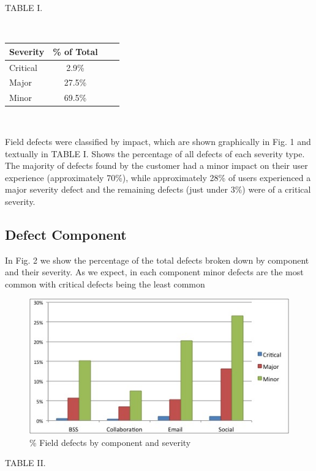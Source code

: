 \documentclass[conference]{IEEEtran}
\begin{document}
TABLE I. 

\ \

\begin{tabular}{l*{2}{c}r} Severity & \% of Total \\ \hline Critical & 2.9\% \\ Major & 27.5\% \\ Minor & 69.5\%   \end{tabular}

\ \

Field defects were classified by impact, which are shown graphically in Fig. 1 and textually in TABLE I.  Shows the percentage of all defects of each severity type. The majority of defects found by the customer had a minor impact on their user experience (approximately 70\%), while approximately 28\% of users experienced a major severity defect and the remaining defects (just under 3\%) were of a critical severity.


\subsection{Defect Component}

In Fig. 2 we show the percentage of the total defects broken down by component and their severity. As we expect, in each component minor defects are the most common with critical defects being the least common

\begin{figure}[h]
\caption{\% Field defects by component and severity}
\begin{center}
\includegraphics[width=\columnwidth]{graphs/graph2.jpg} 
\end{center}
\label{fig:defectcomp}
\end{figure}


TABLE II. 

\ \
\end{document}
